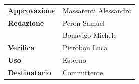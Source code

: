\documentclass{article}
\begin{document}
\begin{center}
    \normalsize
    \begin{center}
        \begin{tabularx}{7cm}{l | X}            
            \textbf{Approvazione} & Massarenti Alessandro\\
            \textbf{Redazione} & Peron Samuel\\
            &Bonavigo Michele\\
            \textbf{Verifica} & Pierobon Luca\\
            \hline
            \textbf{Uso} & Esterno\\
            \textbf{Destinatario} & Committente\\
        \end{tabularx}
    \end{center}
        
\end{center}

\tableofcontents

\newpage


\end{document}
